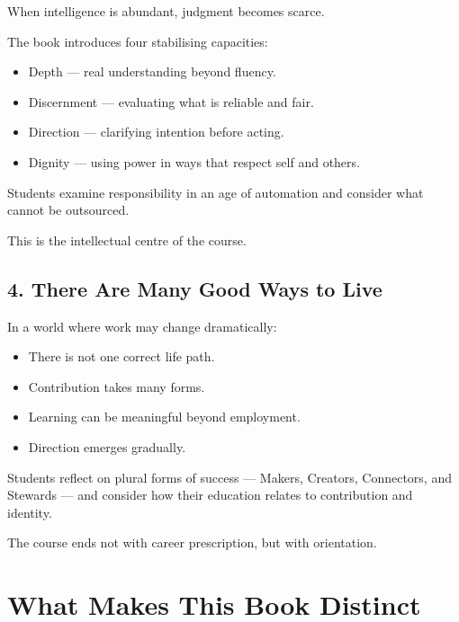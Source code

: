 \documentclass[12pt]{article}
\begin{document}
When intelligence is abundant, judgment becomes scarce.

\begin{tcolorbox}[
  colback=white,
  colframe=blue!50!black,
  opacityframe=0.5,
  fonttitle=\bfseries\color{white},
  title={\mdseries\emoji{brain}\bfseries Non-Cognitive Skills},
  drop shadow
]
The book introduces four stabilising capacities:
\begin{itemize}
  \item Depth — real understanding beyond fluency.
  \item Discernment — evaluating what is reliable and fair.
  \item Direction — clarifying intention before acting.
  \item Dignity — using power in ways that respect self and others.
\end{itemize}
\end{tcolorbox}

Students examine responsibility in an age of automation and consider what cannot be outsourced.

This is the intellectual centre of the course.

\subsection*{4. There Are Many Good Ways to Live}

In a world where work may change dramatically:
\begin{itemize}
  \item There is not one correct life path.
  \item Contribution takes many forms.
  \item Learning can be meaningful beyond employment.
  \item Direction emerges gradually.
\end{itemize}

Students reflect on plural forms of success — Makers, Creators, Connectors, and Stewards — and consider how their education relates to contribution and identity.

The course ends not with career prescription, but with orientation.

\section*{What Makes This Book Distinct}
\end{document}
